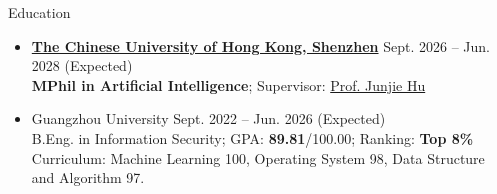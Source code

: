\documentclass{resume} %
\begin{document}

\begin{rSection}{Education}
	
\begin{itemize}[left = -0.22in]
	\item {\bf \href{https://cuhk.edu.cn/en}{The Chinese University of Hong Kong, Shenzhen}} 
	\hfill{Sept. 2026 -- Jun. 2028 (Expected)}
	\\
	\textbf{MPhil in Artificial Intelligence}; Supervisor: \href{https://sai.cuhk.edu.cn/teacher/153}{Prof. Junjie Hu}
	
	\item {Guangzhou University} 
	\hfill{Sept. 2022 -- Jun. 2026 (Expected)}
	\\
	B.Eng. in Information Security; {GPA: \textbf{89.81}/100.00; Ranking: \textbf{Top 8\%} }\\
	Curriculum: Machine Learning 100, Operating System 98, Data Structure and Algorithm 97.
	 	
\end{itemize}

\end{rSection}
\end{document}

